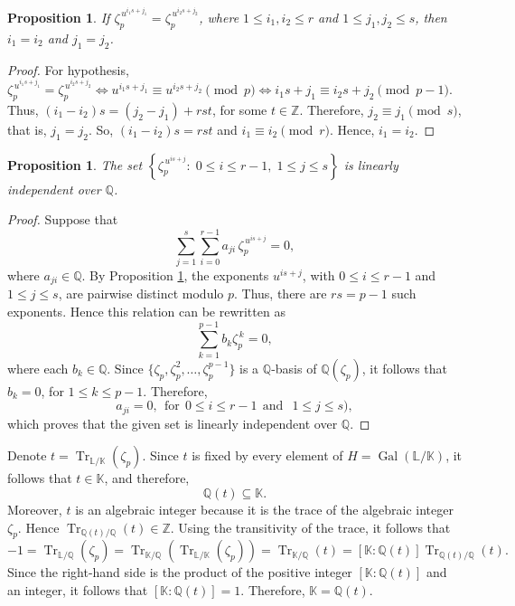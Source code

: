 \documentclass[10pt,a4paper]{amsart}
\newtheorem{proposition}[theorem]{Proposition}
\begin{document}
\begin{proposition} \label{lem-1} If $\zeta_p^{\,u^{i_1s+j_1}} = \zeta_p^{\,u^{i_2s+j_2}}$, where $1\le i_1,i_2\le r$ and $1\le j_1,j_2\le s$, then $i_1=i_2$ and $j_1=j_2$. \end{proposition}
\begin{proof} For hypothesis, $\zeta_p^{\,u^{i_1s+j_1}} = \zeta_p^{\,u^{i_2s+j_2}}\iff u^{i_1s+j_1} \equiv u^{i_2s+j_2} \pmod p \iff i_1s+j_1 \equiv i_2s+j_2 \pmod{p-1}$. Thus, $(i_1-i_2)s=(j_2-j_1)+rst$, for some $t\in\mathbb{Z}$. Therefore, $j_2\equiv j_1 \pmod s$, that is, $j_1=j_2$. So, $(i_1-i_2)s=rst$ and $i_1\equiv i_2 \pmod r$. Hence, $i_1=i_2$. \end{proof}

\begin{proposition}\label{prop-1} The set $\left\{ \zeta_p^{\,u^{is+j}}:\; 0\le i\le r-1,\; 1\le j\le s \right\}$  is linearly independent over $\mathbb{Q}$. \end{proposition}
\begin{proof} Suppose that \[ \sum_{j=1}^{s}\sum_{i=0}^{r-1} a_{ji}\,\zeta_p^{\,u^{is+j}} = 0, \] where $a_{ji}\in\mathbb{Q}$.
By Proposition \ref{lem-1}, the exponents $u^{is+j}$, with $0\le i\le r-1$ and $1\le j\le s$, are pairwise distinct modulo $p$. Thus, there are $rs=p-1$
such exponents. Hence this relation can be rewritten as \[ \sum_{k=1}^{p-1} b_k\zeta_p^{\,k} = 0, \] where each $b_k\in\mathbb{Q}$.
Since $\{\zeta_p,\zeta_p^2,\ldots,\zeta_p^{p-1}\}$ is a $\mathbb{Q}$-basis of $\mathbb{Q}(\zeta_p)$, it follows that $b_k=0$, for $1\le k\le p-1$. 
Therefore, \[ a_{ji}=0, \ \ \mbox{for} \ \ 0\le i\le r-1 \ \ \mbox{and} \ \ \;1\le j\le s), \] which proves that the given set is linearly independent over $\mathbb{Q}$. \end{proof}

Denote $
t=\operatorname{Tr}_{\mathbb{L}/\mathbb{K}}(\zeta_p)$. Since $t$ is fixed by every element of $H=\operatorname{Gal}(\mathbb{L}/\mathbb{K})$, it follows that $ t\in\mathbb{K}$, and therefore,
\[ \mathbb{Q}(t)\subseteq\mathbb{K}. \] Moreover, $t$ is an algebraic integer because it is the trace of the algebraic
integer $\zeta_p$. Hence $\operatorname{Tr}_{\mathbb{Q}(t)/\mathbb{Q}}(t)\in\mathbb{Z}$. Using the transitivity of the trace, it follows that
\[  -1 = \operatorname{Tr}_{\mathbb{L}/\mathbb{Q}}(\zeta_p) = \operatorname{Tr}_{\mathbb{K}/\mathbb{Q}} \!\left( \operatorname{Tr}_{\mathbb{L}/\mathbb{K}}(\zeta_p)\right) = \operatorname{Tr}_{\mathbb{K}/\mathbb{Q}}(t) = [\mathbb{K}:\mathbb{Q}(t)] \operatorname{Tr}_{\mathbb{Q}(t)/\mathbb{Q}}(t). \]
Since the right-hand side is the product of the positive integer $[\mathbb{K}:\mathbb{Q}(t)]$ and an integer, it follows that $[\mathbb{K}:\mathbb{Q}(t)]=1$.
Therefore, $\mathbb{K}=\mathbb{Q}(t)$.
\end{document}

